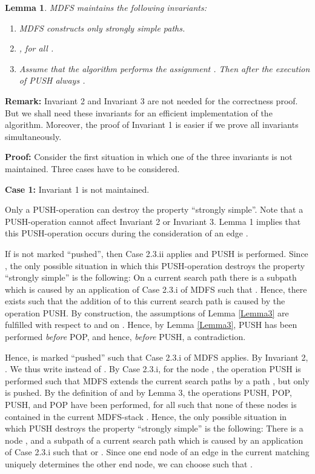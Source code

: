 \documentclass[12pt,twoside,a4paper]{article}
\newtheorem{lemma}{Lemma}
\begin{document}
\begin{lemma} \label{Lemma4}
MDFS maintains the following invariants:
\vspace{-0.2cm}
\begin{enumerate}
\item 
MDFS constructs only strongly simple paths.
\item 
, for all .
\item
Assume that the algorithm performs the assignment . 
Then after the execution of PUSH always . 
\end{enumerate}
\end{lemma}
{\bf Remark:} Invariant 2 and Invariant 3 are not needed for the correctness
proof. But we shall need these invariants for an efficient 
implementation of the algorithm. Moreover, the proof of Invariant 1 is easier 
if we prove all invariants simultaneously.

\medskip
\noindent
{\bf Proof:} Consider the first situation in which one of the three invariants
is not maintained. Three cases have to be considered.

\medskip
\noindent
{\bf Case 1:} Invariant 1 is not maintained.

\medskip
Only a PUSH-operation can destroy the property ``strongly simple''. Note that
a PUSH-operation cannot affect Invariant 2 or Invariant 3.
Lemma 1 implies that this PUSH-operation occurs during the consideration
of an edge . 

If  is not marked ``pushed'', then Case 2.3.ii applies and
PUSH is performed. Since , 
the only possible situation in which this PUSH-operation destroys the
property ``strongly simple'' is the following:
On a current search path there is a subpath  which is caused by an 
application of Case 2.3.i of MDFS such that .
Hence, there exists  such that the addition of  to this 
current search path is caused by the operation PUSH. By construction, 
the assumptions of Lemma \ref{Lemma3} are fulfilled with respect to  and  on . 
Hence, by Lemma \ref{Lemma3}, PUSH has been performed {\em before\/} 
POP, and hence, {\em before\/} PUSH, a contradiction. 

Hence,  is marked ``pushed'' such that Case 2.3.i of MDFS 
applies. By Invariant 2, . We thus write 
 instead of . 
By Case 2.3.i, for the node , the operation PUSH
is performed such that MDFS extends the current search paths by a path , 
but only  is pushed. 
By the definition of  and by Lemma 3, the operations PUSH,
POP, PUSH, and POP have been 
performed, for all  such that none of these nodes is contained
in the current MDFS-stack . Hence, the only possible situation in which
PUSH destroys the property ``strongly simple'' is the following:
There is a node , and a subpath  of a current
search path which is caused by an application of Case 2.3.i such that
 or . Since one end node of an edge in 
the current matching uniquely determines the other end node, we can choose 
 such that .
\end{document}
